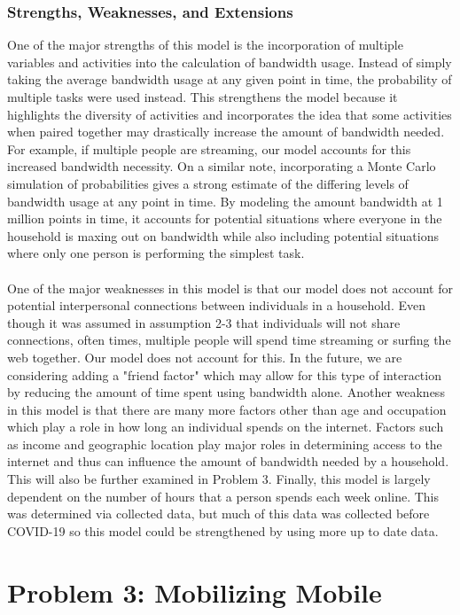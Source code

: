 \documentclass[12pt]{article}
\begin{document}
\subsubsection{Strengths, Weaknesses, and Extensions}
One of the major strengths of this model is the incorporation of multiple variables and activities into the calculation of bandwidth usage. Instead of simply taking the average bandwidth usage at any given point in time, the probability of multiple tasks were used instead. This strengthens the model because it highlights the diversity of activities and incorporates the idea that some activities when paired together may drastically increase the amount of bandwidth needed. For example, if multiple people are streaming, our model accounts for this increased bandwidth necessity. On a similar note, incorporating a Monte Carlo simulation of probabilities gives a strong estimate of the differing levels of bandwidth usage at any point in time. By modeling the amount bandwidth at 1 million points in time, it accounts for potential situations where everyone in the household is maxing out on bandwidth while also including potential situations where only one person is performing the simplest task.
\\
\\
One of the major weaknesses in this model is that our model does not account for potential interpersonal connections between individuals in a household. Even though it was assumed in assumption 2-3 that individuals will not share connections, often times, multiple people will spend time streaming or surfing the web together. Our model does not account for this. In the future, we are considering adding a "friend factor" which may allow for this type of interaction by reducing the amount of time spent using bandwidth alone. Another weakness in this model is that there are many more factors other than age and occupation which play a role in how long an individual spends on the internet. Factors such as income and geographic location play major roles in determining access to the internet and thus can influence the amount of bandwidth needed by a household. This will also be further examined in Problem 3. Finally, this model is largely dependent on the number of hours that a person spends each week online. This was determined via collected data, but much of this data was collected before COVID-19 so this model could be strengthened by using more up to date data.  

\section{Problem 3: Mobilizing Mobile}
\end{document}
